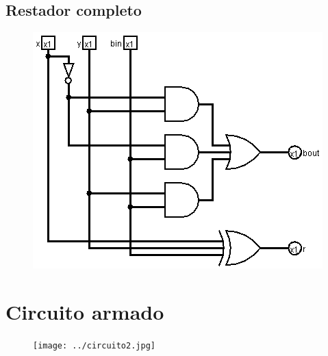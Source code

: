 \documentclass[11pt]{article}
\begin{document}
	\subsection{Restador completo}
	\begin{figure}[H]
		\centering
		\includegraphics[scale=0.7]{fullSubtracter.png}
	\end{figure}
	
	\section{Circuito armado}
	\begin{figure}[H]
		\centering
		\texttt{[image: ../circuito2.jpg]}
	\end{figure}
	
\end{document}

